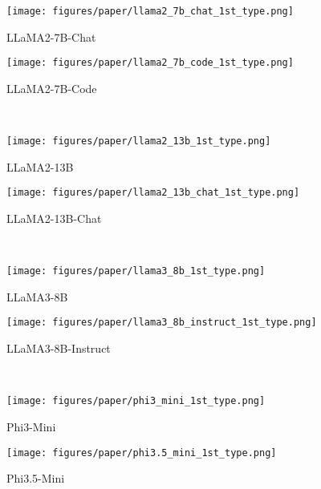 \begin{figure*}[!t]
    \centering
    \begin{subfigure}[t]{0.47\textwidth}
        \texttt{[image: figures/paper/llama2\_7b\_chat\_1st\_type.png]}
        \caption{LLaMA2-7B-Chat}\label{fig:llama2_7b_chat_1st_type}
    \end{subfigure}
    \begin{subfigure}[t]{0.47\textwidth}
        \texttt{[image: figures/paper/llama2\_7b\_code\_1st\_type.png]}
        \caption{LLaMA2-7B-Code}\label{fig:llama2_7b_code_1st_type}
    \end{subfigure}\\
    \begin{subfigure}[t]{0.47\textwidth}
        \texttt{[image: figures/paper/llama2\_13b\_1st\_type.png]}
        \caption{LLaMA2-13B}\label{fig:llama2_13b_1st_type}
    \end{subfigure}
    \begin{subfigure}[t]{0.47\textwidth}
        \texttt{[image: figures/paper/llama2\_13b\_chat\_1st\_type.png]}
        \caption{LLaMA2-13B-Chat}\label{fig:llama2_13b_chat_1st_type}
    \end{subfigure}\\
    \begin{subfigure}[t]{0.47\textwidth}
        \texttt{[image: figures/paper/llama3\_8b\_1st\_type.png]}
        \caption{LLaMA3-8B}\label{fig:llama3_8b_1st_type}
    \end{subfigure}
    \begin{subfigure}[t]{0.47\textwidth}
        \texttt{[image: figures/paper/llama3\_8b\_instruct\_1st\_type.png]}
        \caption{LLaMA3-8B-Instruct}\label{fig:llama3_8b_instruct_1st_type}
    \end{subfigure}\\
    \begin{subfigure}[t]{0.47\textwidth}
        \texttt{[image: figures/paper/phi3\_mini\_1st\_type.png]}
        \caption{Phi3-Mini}\label{fig:phi3_mini_1st_type}
    \end{subfigure}
    \begin{subfigure}[t]{0.47\textwidth}
        \texttt{[image: figures/paper/phi3.5\_mini\_1st\_type.png]}
        \caption{Phi3.5-Mini}\label{fig:phi3.5_mini_1st_type}
    \end{subfigure}\\
    \begin{subfigure}[t]{0.47\textwidth}

\end{subfigure}
\end{figure*}

